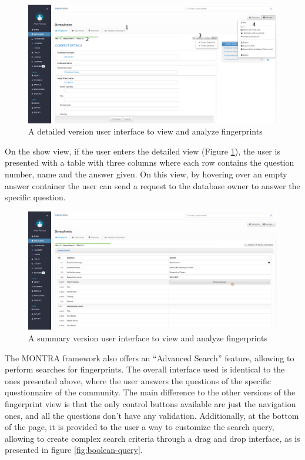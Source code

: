 \begin{figure}[h]
    \center
    \includegraphics[width=\textwidth]{fingerprint-show-detailed}
    \caption{A detailed version user interface to view and analyze fingerprints}
    \label{fig:fingerprint-show-detailed}
\end{figure}

On the show view, if the user enters the detailed view (Figure \ref{fig:fingerprint-show-detailed}), the user is presented with a table with three columns where each row contains the question number, name and the answer given.
On this view, by hovering over an empty answer container the user can send a request to the database owner to answer the specific question.

\begin{figure}[h]
    \center
    \includegraphics[width=\textwidth]{fingerprint-show-summary}
    \caption{A summary version user interface to view and analyze fingerprints}
    \label{fig:fingerprint-show-summary}
\end{figure}

The MONTRA framework also offers an ``Advanced Search'' feature, allowing to perform searches for fingerprints.
The overall interface used is identical to the ones presented above, where the user answers the questions of the specific questionnaire of the community.
The main difference to the other versions of the fingerprint view is that the only control buttons available are just the navigation ones, and all the questions don't have any validation.
Additionally, at the bottom of the page, it is provided to the user a way to customize the search query, allowing to create complex search criteria through a drag and drop interface, as is presented in figure \ref{fig:boolean-query}.

